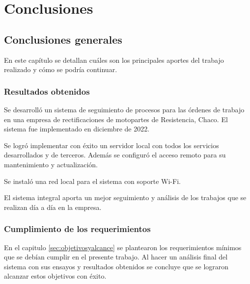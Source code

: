 
\chapter{Conclusiones} %

\label{Chapter5} %




\section{Conclusiones generales }

En este capítulo se detallan cuáles son los principales aportes del trabajo realizado y cómo se podría continuar. 

\subsection{Resultados obtenidos}

Se desarrolló un sistema de seguimiento de procesos para las órdenes de trabajo en una empresa de rectificaciones de motopartes de Resistencia, Chaco. El sistema fue implementado en diciembre de 2022. 

Se logró implementar con éxito un servidor local con todos los servicios desarrollados y de terceros. Además se configuró el acceso remoto para su mantenimiento y actualización.

Se instaló una red local para el sistema con soporte Wi-Fi.

El sistema integral aporta un mejor seguimiento y análisis de los trabajos que se realizan día a día en la empresa.

\subsection{Cumplimiento de los requerimientos}

En el capitulo \ref{sec:objetivosyalcance} se plantearon los requerimientos mínimos que se debían cumplir en el presente trabajo. Al hacer un análisis final del sistema con sus ensayos y resultados obtenidos se concluye que se lograron alcanzar estos objetivos con éxito. 

